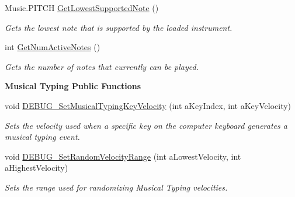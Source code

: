 \begin{Indent}
\begin{DoxyCompactItemize}
\mbox{\label{group___virtual_instrument_manager_aeb152486450d6c6dc50078e1644c4c6a}} 
Music.\+P\+I\+T\+CH \hyperlink{group___virtual_instrument_manager_aeb152486450d6c6dc50078e1644c4c6a}{Get\+Lowest\+Supported\+Note} ()
\begin{DoxyCompactList}\small\item\em Gets the lowest note that is supported by the loaded instrument. \end{DoxyCompactList}\item 
\mbox{\label{group___virtual_instrument_manager_a3d6c823b1c1083eac8202f6c89e60b48}} 
int \hyperlink{group___virtual_instrument_manager_a3d6c823b1c1083eac8202f6c89e60b48}{Get\+Num\+Active\+Notes} ()
\begin{DoxyCompactList}\small\item\em Gets the number of notes that currently can be played. \end{DoxyCompactList}\end{DoxyCompactItemize}
\end{Indent}
\begin{Indent}\textbf{ Musical Typing Public Functions}\par
\begin{DoxyCompactItemize}
\item 
void \hyperlink{group___audio_testing_gaf956ccb63ebd16934459735ef2acc320}{D\+E\+B\+U\+G\+\_\+\+Set\+Musical\+Typing\+Key\+Velocity} (int a\+Key\+Index, int a\+Key\+Velocity)
\begin{DoxyCompactList}\small\item\em Sets the velocity used when a specific key on the computer keyboard generates a musical typing event. \end{DoxyCompactList}\item 
void \hyperlink{group___audio_testing_ga8449cd75fecbc3226fff694fdae6d496}{D\+E\+B\+U\+G\+\_\+\+Set\+Random\+Velocity\+Range} (int a\+Lowest\+Velocity, int a\+Highest\+Velocity)
\begin{DoxyCompactList}\small\item\em Sets the range used for randomizing Musical Typing velocities. \end{DoxyCompactList}\end{DoxyCompactItemize}
\end{Indent}
